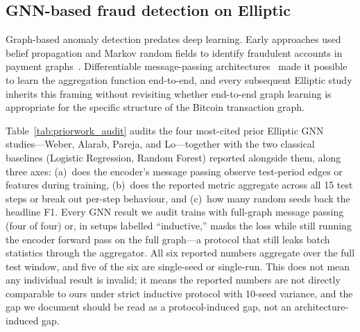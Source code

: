 \subsection{GNN-based fraud detection on Elliptic}
\label{sec:related_gnn}

Graph-based anomaly detection predates deep learning.  Early
approaches used belief propagation and Markov random fields to
identify fraudulent accounts in payment
graphs~\citep{akoglu2015graph}.  Differentiable message-passing
architectures~\citep{gilmer2017mpnn} made it possible to learn the
aggregation function end-to-end, and every subsequent Elliptic study
inherits this framing without revisiting whether end-to-end graph
learning is appropriate for the specific structure of the Bitcoin
transaction graph.

Table~\ref{tab:priorwork_audit} audits the four most-cited prior
Elliptic GNN studies---Weber, Alarab, Pareja, and Lo---together
with the two classical baselines (Logistic Regression, Random
Forest) reported alongside them, along three axes: (a)~does the
encoder's message passing observe test-period edges or features
during training, (b)~does the reported metric aggregate across all
15 test steps or break out per-step behaviour, and (c)~how many
random seeds back the headline F1.  Every GNN result we audit
trains with full-graph message passing (four of four) or, in
setups labelled ``inductive,'' masks the loss while still running
the encoder forward pass on the full graph---a protocol that still
leaks batch statistics through the aggregator.  All six reported
numbers aggregate over the full test window, and five of the six
are single-seed or single-run.  This does not mean any individual
result is invalid; it means the reported numbers are not directly
comparable to ours under strict inductive protocol with 10-seed
variance, and the gap we document should be read as a
protocol-induced gap, not an architecture-induced gap.

